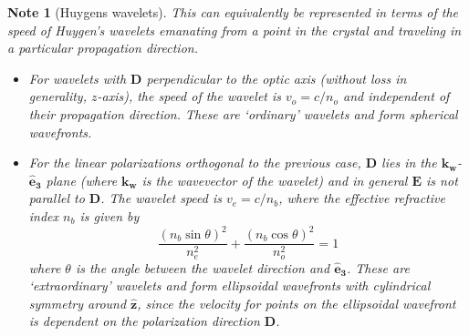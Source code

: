 \documentclass[a4paper]{article}
\newtheorem{Note}{Note}[section]
\theoremstyle{new}
\begin{document}
\begin{Note}[Huygens wavelets]
This can equivalently be represented in terms of the speed of Huygen's wavelets emanating from a point in the crystal and traveling in a particular propagation direction.
\begin{itemize}
    \item For wavelets with $\mathbf{D}$ perpendicular to the optic axis (without loss in generality, $z$-axis), the speed of the wavelet is $v_o=c/n_o$ and independent of their propagation direction. These are `ordinary' wavelets and form spherical wavefronts.
    \item For the linear polarizations orthogonal to the previous case, $\mathbf{D}$ lies in the $\mathbf{k_w}$-$\mathbf{\hat{e}_3}$ plane (where $\mathbf{k_w}$ is the wavevector of the wavelet) and in general $\mathbf{E}$ is not parallel to $\mathbf{D}$. The wavelet speed is $v_e=c/n_b$, where the effective refractive index $n_b$ is given by
    $$\frac{(n_b\sin\theta)^2}{n_e^2}+\frac{(n_b\cos\theta)^2}{n_o^2}=1$$
    where $\theta$ is the angle between the wavelet direction and $\mathbf{\hat{e}_3}$. These are `extraordinary' wavelets and form ellipsoidal wavefronts with cylindrical symmetry around $\mathbf{\hat{z}}$, since the velocity for points on the ellipsoidal wavefront is dependent on the polarization direction $\mathbf{D}$.
\end{itemize}
\end{Note}
\end{document}
